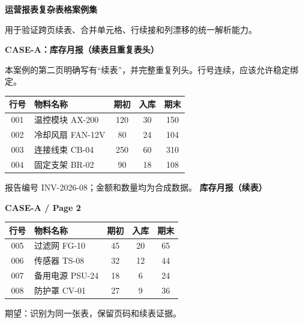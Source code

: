 \documentclass[10pt,a4paper]{article}
\begin{document}
{\fontsize{20}{24}\selectfont\bfseries 运营报表复杂表格案例集}\par\vspace{2mm}
{\color{gray}\small 用于验证跨页续表、合并单元格、行续接和列漂移的统一解析能力。}\par\vspace{6mm}
{\color{blue}\large\bfseries CASE-A：库存月报（续表且重复表头）}\par\vspace{3mm}
本案例的第二页明确写有“续表”，并完整重复列头。行号连续，应该允许稳定绑定。
\renewcommand{\arraystretch}{1.35}
\par\medskip\noindent\begin{tabular}{|c|p{48mm}|c|c|c|}\hline
\rowcolor{blue!12} 行号 & 物料名称 & 期初 & 入库 & 期末\\\hline
001 & 温控模块 AX-200 & 120 & 30 & 150\\\hline
002 & 冷却风扇 FAN-12V & 80 & 24 & 104\\\hline
003 & 连接线束 CB-04 & 250 & 60 & 310\\\hline
004 & 固定支架 BR-02 & 90 & 18 & 108\\\hline
\end{tabular}
\vfill\small\color{gray}报告编号 INV-2026-08；金额和数量均为合成数据。
\newpage
{\fontsize{18}{22}\selectfont\bfseries 库存月报（续表）}\par\vspace{2mm}
{\color{blue}\large\bfseries CASE-A / Page 2}\par\vspace{4mm}
\par\medskip\noindent\begin{tabular}{|c|p{48mm}|c|c|c|}\hline
\rowcolor{blue!12} 行号 & 物料名称 & 期初 & 入库 & 期末\\\hline
005 & 过滤网 FG-10 & 45 & 20 & 65\\\hline
006 & 传感器 TS-08 & 32 & 12 & 44\\\hline
007 & 备用电源 PSU-24 & 18 & 6 & 24\\\hline
008 & 防护罩 CV-01 & 27 & 9 & 36\\\hline
\end{tabular}
\vspace{7mm}\par\color{green!50!black}\small 期望：识别为同一张表，保留页码和续表证据。
\vspace{14mm}
\par\medskip{}\par\vspace{3mm}
\end{document}
